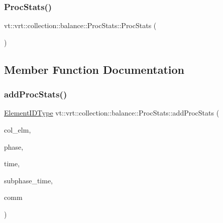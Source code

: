 \subsubsection{\texorpdfstring{Proc\+Stats()}{ProcStats()}}
{\footnotesize\ttfamily vt\+::vrt\+::collection\+::balance\+::\+Proc\+Stats\+::\+Proc\+Stats (\begin{DoxyParamCaption}{ }\end{DoxyParamCaption})\hspace{0.3cm}{\ttfamily [default]}}



\subsection{Member Function Documentation}
\mbox{\label{structvt_1_1vrt_1_1collection_1_1balance_1_1_proc_stats_a21164188d5d1d09724959e95e5c4f2e4}} 
\subsubsection{\texorpdfstring{add\+Proc\+Stats()}{addProcStats()}}
{\footnotesize\ttfamily \hyperlink{namespacevt_1_1vrt_1_1collection_1_1balance_a14c8d2c972f2913aa3f1636e5be0a120}{Element\+I\+D\+Type} vt\+::vrt\+::collection\+::balance\+::\+Proc\+Stats\+::add\+Proc\+Stats (\begin{DoxyParamCaption}\item[{\hyperlink{structvt_1_1vrt_1_1collection_1_1_migratable}{Migratable} $\ast$}]{col\+\_\+elm,  }\item[{\hyperlink{namespacevt_a46ce6733d5cdbd735d561b7b4029f6d7}{Phase\+Type} const \&}]{phase,  }\item[{\hyperlink{namespacevt_a876a9d0cd5a952859c72de8a46881442}{Time\+Type} const \&}]{time,  }\item[{std\+::vector$<$ \hyperlink{namespacevt_a876a9d0cd5a952859c72de8a46881442}{Time\+Type} $>$ const \&}]{subphase\+\_\+time,  }\item[{\hyperlink{namespacevt_1_1vrt_1_1collection_1_1balance_aa50d4cbbfa3c643e7303fc6e08f411fb}{Comm\+Map\+Type} const \&}]{comm }\end{DoxyParamCaption})}

